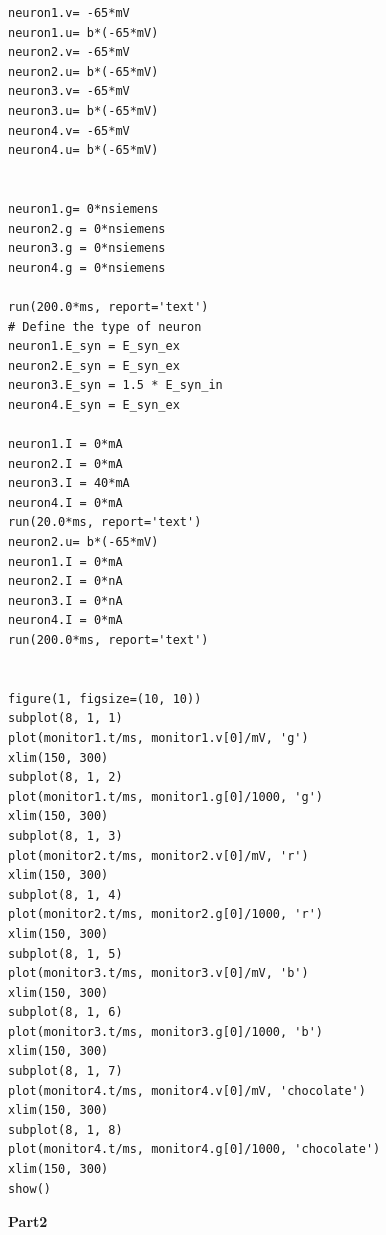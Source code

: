 \documentclass[12pt]{article}
\begin{document}
\begin{lstlisting}
neuron1.v= -65*mV
neuron1.u= b*(-65*mV)
neuron2.v= -65*mV
neuron2.u= b*(-65*mV)
neuron3.v= -65*mV
neuron3.u= b*(-65*mV)
neuron4.v= -65*mV
neuron4.u= b*(-65*mV)


neuron1.g= 0*nsiemens
neuron2.g = 0*nsiemens
neuron3.g = 0*nsiemens
neuron4.g = 0*nsiemens

run(200.0*ms, report='text')
# Define the type of neuron
neuron1.E_syn = E_syn_ex
neuron2.E_syn = E_syn_ex
neuron3.E_syn = 1.5 * E_syn_in
neuron4.E_syn = E_syn_ex

neuron1.I = 0*mA
neuron2.I = 0*mA
neuron3.I = 40*mA
neuron4.I = 0*mA
run(20.0*ms, report='text')
neuron2.u= b*(-65*mV)
neuron1.I = 0*mA
neuron2.I = 0*nA
neuron3.I = 0*nA
neuron4.I = 0*mA
run(200.0*ms, report='text')


figure(1, figsize=(10, 10))
subplot(8, 1, 1)
plot(monitor1.t/ms, monitor1.v[0]/mV, 'g')
xlim(150, 300)
subplot(8, 1, 2)
plot(monitor1.t/ms, monitor1.g[0]/1000, 'g')
xlim(150, 300)
subplot(8, 1, 3)
plot(monitor2.t/ms, monitor2.v[0]/mV, 'r')
xlim(150, 300)
subplot(8, 1, 4)
plot(monitor2.t/ms, monitor2.g[0]/1000, 'r')
xlim(150, 300)
subplot(8, 1, 5)
plot(monitor3.t/ms, monitor3.v[0]/mV, 'b')
xlim(150, 300)
subplot(8, 1, 6)
plot(monitor3.t/ms, monitor3.g[0]/1000, 'b')
xlim(150, 300)
subplot(8, 1, 7)
plot(monitor4.t/ms, monitor4.v[0]/mV, 'chocolate')
xlim(150, 300)
subplot(8, 1, 8)
plot(monitor4.t/ms, monitor4.g[0]/1000, 'chocolate')
xlim(150, 300)
show()

\end{lstlisting}
\newpage
\normalsize\textbf{Part2 }
\\
\end{document}
